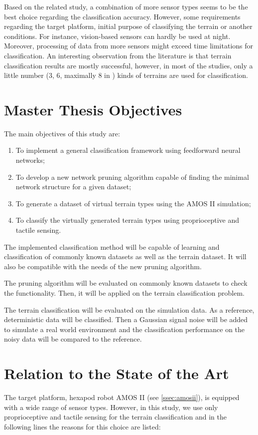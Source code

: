 Based on the related study, a combination of more sensor types seems to be the best choice regarding the classification accuracy. However, some requirements regarding the target platform, initial purpose of classifying the terrain or another conditions. For instance, vision-based sensors can hardly be used at night. Moreover, processing of data from more sensors might exceed time limitations for classification. An interesting observation from the literature is that terrain classification results are mostly successful, however, in most of the studies, only a little number ($ 3 $, $ 6 $, maximally $ 8 $ in \citep{article:01:visual}) kinds of terrains are used for classification.

\section{Master Thesis Objectives} \label{sec:goals}
The main objectives of this study are:

\begin{enumerate}
\item To implement a general classification framework using feedforward neural networks;
\item To develop a new network pruning algorithm capable of finding the minimal network structure for a given dataset;
\item To generate a dataset of virtual terrain types using the AMOS II simulation;
\item To classify the virtually generated terrain types using proprioceptive and tactile sensing.
\end{enumerate}

The implemented classification method will be capable of learning and classification of commonly known datasets as well as the terrain dataset. It will also be compatible with the needs of the new pruning algorithm.

The pruning algorithm will be evaluated on commonly known datasets to check the functionality. Then, it will be applied on the terrain classification problem.

The terrain classification will be evaluated on the simulation data. As a reference, deterministic data will be classified. Then a Gaussian signal noise will be added to simulate a real world environment and the classification performance on the noisy data will be compared to the reference.

\section{Relation to the State of the Art}
The target platform, hexapod robot AMOS II (see \cref{ssec:amosii}), is equipped with a wide range of sensor types. However, in this study, we use only proprioceptive and tactile sensing for the terrain classification and in the following lines the reasons for this choice are listed: 

